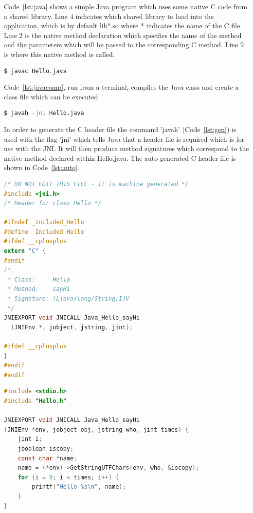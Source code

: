 \documentclass[a4paper, titlepage]{article}
\begin{document}
Code~\ref{lst:java} shows a simple Java program which uses some native C code from a shared library. Line 4 indicates which shared library to load into the application, which is by default lib*.so where * indicates the name of the C file. Line 2 is the native method declaration which specifies the name of the method and the parameters which will be passed to the corresponding C method. Line 9 is where this native method is called.

\begin{lstlisting}[language=sh, caption={Compiling basic Java program}, label=lst:javacomp]
$ javac Hello.java
\end{lstlisting}

Code~\ref{lst:javacomp}, run from a terminal, compiles the Java class and create a class file which can be executed.

\begin{lstlisting}[language=sh, caption={Generating C header file}, label=lst:gen]
$ javah -jni Hello.java
\end{lstlisting}

In order to generate the C header file the command 'javah' (Code~\ref{lst:gen}) is used with the flag 'jni' which tells Java that a header file is required which is for use with the JNI. It will then produce method signatures which correspond to the native method declared within Hello.java. The auto generated C header file is shown in Code~\ref{lst:auto}.

\begin{lstlisting}[language=C, caption={Auto-generated C header file}, label=lst:auto]
/* DO NOT EDIT THIS FILE - it is machine generated */
#include <jni.h>
/* Header for class Hello */

#ifndef _Included_Hello
#define _Included_Hello
#ifdef __cplusplus
extern "C" {
#endif
/*
 * Class:     Hello
 * Method:    sayHi
 * Signature: (Ljava/lang/String;I)V
 */
JNIEXPORT void JNICALL Java_Hello_sayHi
  (JNIEnv *, jobject, jstring, jint);

#ifdef __cplusplus
}
#endif
#endif
\end{lstlisting}

\begin{lstlisting}[language=C, caption={C source file corresponding to auto-generated header file}, label=lst:source]
#include <stdio.h>
#include "Hello.h"

JNIEXPORT void JNICALL Java_Hello_sayHi
(JNIEnv *env, jobject obj, jstring who, jint times) {
    jint i;
    jboolean iscopy;
    const char *name;
    name = (*env)->GetStringUTFChars(env, who, &iscopy);
    for (i = 0; i < times; i++) {
        printf("Hello %s\n", name);
    }
}
\end{lstlisting}
\end{document}
